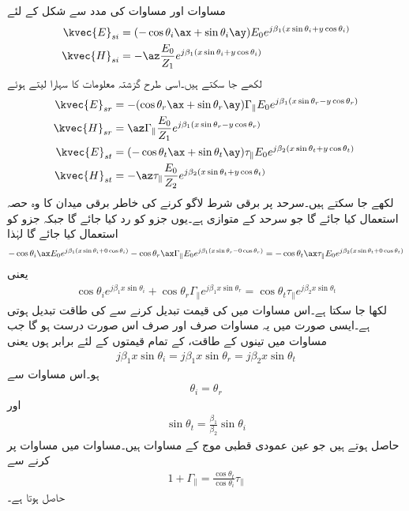 مساوات  اور مساوات  کی مدد سے شکل  کے لئے
\begin{align}
\kvec{E}_{si}&=(-\cos \theta_i \ax+\sin \theta_i \ay)E_0  e^{j\beta_1 (x\sin \theta_i +y \cos \theta_i)}\\ 
\kvec{H}_{si}&=-\az \frac{E_0}{Z_1} e^{j\beta_1 (x\sin \theta_i +y \cos \theta_i)}
\end{align}
لکھے جا سکتے ہیں۔اسی طرح گزشتہ معلومات کا سہارا لیتے ہوئے
\begin{align}
\kvec{E}_{sr}&= -(\cos \theta_r \ax+\sin \theta_r \ay)\Gamma_{\parallel} E_0 e^{ j \beta_1 (x \sin \theta_r-y\cos \theta_r)}\\
\kvec{H}_{sr}&=\az\Gamma_{\parallel} \frac{ E_0}{Z_1} e^{j \beta_1 (x \sin \theta_r-y\cos \theta_r)}\\
\kvec{E}_{st} &= (-\cos \theta_t \ax+\sin \theta_t \ay )\tau_{\parallel} E_0 e^{j \beta_2 (x \sin \theta_t+y\cos \theta_t)}\\
\kvec{H}_{st} &=-\az \tau_{\parallel} \frac{E_0}{Z_2} e^{j \beta_2 (x \sin \theta_t+y\cos \theta_t)} 
\end{align}
لکھے جا سکتے ہیں۔سرحد  پر برقی شرط لاگو کرنے کی خاطر برقی میدان کا وہ حصہ استعمال کیا جائے گا جو سرحد کے متوازی ہے۔یوں  جزو کو رد کیا جائے گا جبکہ  جزو کو استعمال کیا جائے گا لہٰذا
\begin{align*}
-\cos \theta_i \ax E_0  e^{j\beta_1 (x\sin \theta_i +0 \cos \theta_i)}- \cos \theta_r \ax\Gamma_{\parallel} E_0 e^{ j \beta_1 (x \sin \theta_r-0\cos \theta_r)}=-\cos \theta_t \ax\tau_{\parallel} E_0 e^{j \beta_2 (x \sin \theta_t+0\cos \theta_t)}
\end{align*}
یعنی
\begin{align}\label{مساوات_ترچھی_متوازی_قطبی_موج_برقی_شرط}
\cos \theta_i    e^{j\beta_1 x\sin \theta_i}+ \cos \theta_r \Gamma_{\parallel}  e^{ j \beta_1 x \sin \theta_r}=\cos \theta_t \tau_{\parallel}  e^{j \beta_2 x \sin \theta_t}
\end{align}
لکھا جا سکتا ہے۔اس مساوات میں  کی قیمت تبدیل کرنے سے  کی طاقت تبدیل ہوتی ہے۔ایسی صورت میں یہ مساوات صرف اور صرف اس صورت درست ہو گا جب مساوات میں تینوں  کے طاقت،  کے تمام قیمتوں کے لئے برابر ہوں یعنی
\begin{align}\label{مساوات_ترچھی_متوازی_قطبی_موج_برقی_شرط_پہلا_نتیجہ}
j \beta_1 x\sin \theta_i=j \beta_1 x \sin \theta_r=j \beta_2 x \sin \theta_t
\end{align} 
ہو۔اس مساوات سے
\begin{align}
\theta_i=\theta_r
\end{align}
اور
\begin{align}
\sin \theta_t =\frac{\beta_1}{\beta_2} \sin \theta_i
\end{align}
حاصل ہوتے ہیں جو عین عمودی قطبی موج کے مساوات ہیں۔مساوات  میں مساوات  پر کرنے سے
\begin{align}\label{مساوات_ترچھی_متوازی_انعکاسی_انحرافی_تعلق_الف}
1   +  \Gamma_{\parallel} =\frac{\cos \theta_t}{\cos \theta_i} \tau_{\parallel} 
\end{align}
حاصل ہوتا ہے۔

